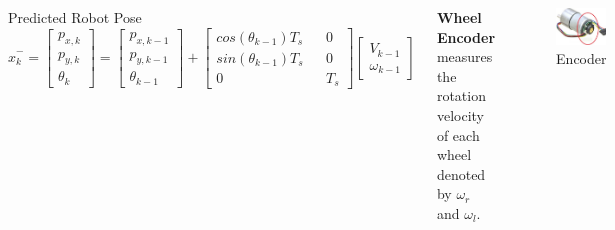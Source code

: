 \begin{frame}
\begin{columns}
	\begin{block}{\footnotesize Predicted Robot Pose}
		\begin{equation}
			\hat{x}^-_k=
			\begin{bmatrix}
				p_{x,k}\\
				p_{y,k}\\
				\theta_k
			\end{bmatrix}=\begin{bmatrix}
				p_{x,k-1}\\
				p_{y,k-1}\\
				\theta_{k-1}
			\end{bmatrix}+\begin{bmatrix}
				cos(\theta_{k-1}) T_s && 0\\
				sin(\theta_{k-1}) T_s && 0\\
				0 && T_s
			\end{bmatrix}
			\begin{bmatrix}
				V_{k-1}\\
				\omega_{k-1}
			\end{bmatrix}
		\end{equation}
	\end{block}
	
	
	\textbf{Wheel Encoder} measures the rotation velocity of each wheel denoted by \(\omega_r\) and \(\omega_l\).
	\begin{figure}
		\caption{Encoder}
		\includegraphics[scale=0.2]{image/encoder}
	\end{figure}
	\end{columns}
\end{frame}




